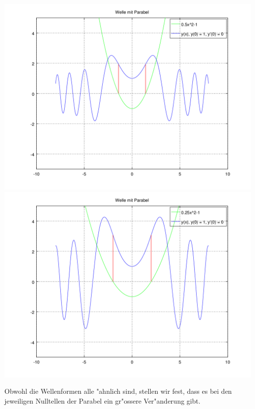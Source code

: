 \noindent
\includegraphics[scale=0.35]{./wellen/images/vara/ahalbe.png}
\includegraphics[scale=0.35]{./wellen/images/vara/aviertel.png}

Obwohl die Wellenformen alle "ahnlich sind, stellen wir fest, dass es bei den 
jeweiligen Nulltellen der Parabel ein gr"ossere Ver"anderung gibt.
